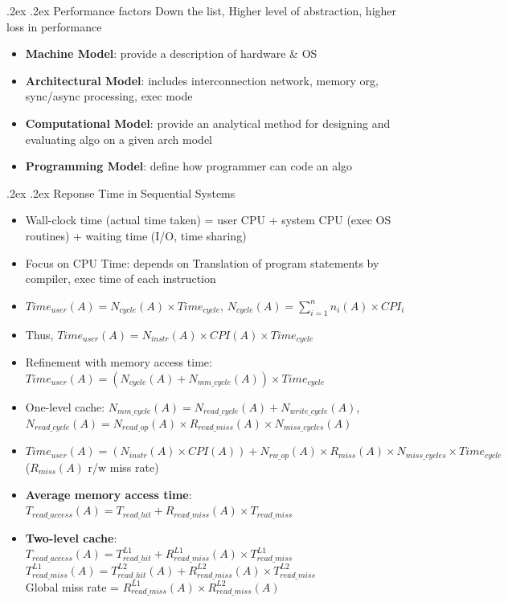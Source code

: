 \documentclass[10pt,landscape,a4paper]{article}
\makeatletter
\renewcommand{\subsection}{\@startsection{subsection}{1}{0mm}%
  {.2ex}%
  {.2ex}%
{\sffamily\bfseries}}
\renewcommand{\subsubsection}{\@startsection{subsubsection}{1}{0mm}%
  {.2ex}%
  {.2ex}%
{\rmfamily\bfseries}}
\makeatother
\begin{document}
\begin{multicols*}{4}
  \subsection{Performance factors}
  Down the list, Higher level of abstraction, higher loss in performance
  \begin{itemize}
    \item \textbf{Machine Model}: provide a description of hardware \& OS
    \item \textbf{Architectural Model}: includes interconnection network, memory org, sync/async processing, exec mode
    \item \textbf{Computational Model}: provide an analytical method for designing and evaluating algo on a given arch model
    \item \textbf{Programming Model}: define how programmer can code an algo
  \end{itemize}
  \subsubsection{Reponse Time in Sequential Systems}
  \begin{itemize}
    \item Wall-clock time (actual time taken) = user CPU + system CPU (exec OS routines) + waiting time (I/O, time sharing)
    \item Focus on CPU Time: depends on Translation of program statements by compiler, exec time of each instruction
    \item $Time_{user}(A) = N_{cycle}(A) \times Time_{cycle}$, $N_{cycle}(A) = \sum\limits_{i = 1}^{n} n_i(A)\times CPI_i$
    \item Thus, $Time_{user}(A) = N_{instr}(A)\times CPI(A) \times Time_{cycle}$
    \item Refinement with memory access time:\\
    $Time_{user}(A) = (N_{cycle}(A) + N_{mm\_cycle}(A)) \times Time_{cycle}$
    \item One-level cache: $N_{mm\_cycle}(A) = N_{read\_cycle}(A) + N_{write\_cycle}(A)$, $N_{read\_cycle}(A) = N_{read\_op}(A)\times R_{read\_miss}(A) \times N_{miss\_cycles}(A)$
    \item $Time_{user}(A) = (N_{instr}(A)\times CPI(A)) + N_{rw\_op}(A)\times R_{miss}(A) \times N_{miss\_cycles} \times Time_{cycle}$ ($R_{miss}(A)$ r/w miss rate)
    \item \textbf{Average memory access time}:\\
    $T_{read\_access}(A) = T_{read\_hit} + R_{read\_miss}(A) \times T_{read\_miss}$
    \item \textbf{Two-level cache}:\\
    $T_{read\_access}(A) = T^{L1}_{read\_hit} + R^{L1}_{read\_miss}(A) \times T^{L1}_{read\_miss}$\\
    $T^{L1}_{read\_miss}(A)= T^{L2}_{read\_hit}(A) + R^{L2}_{read\_miss}(A) \times T^{L2}_{read\_miss}$\\
    Global miss rate = $R^{L1}_{read\_miss}(A) \times R^{L2}_{read\_miss}(A)$
  \end{itemize}

\end{multicols*}
\end{document}
